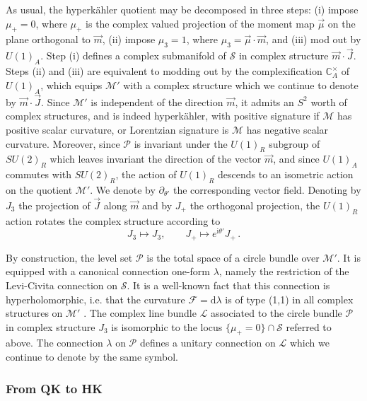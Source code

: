 \documentclass[12pt,reqno]{article}
\numberwithin{equation}{section}
\newcommand{\be}{\begin{equation}}
\newcommand{\ee}{\end{equation}}
\newcommand{\de}{\mathrm{d}}
\newcommand{\I}{\mathrm{i}}
\newcommand{\cS}{\mathcal{S}}
\newcommand{\cM}{\mathcal{M}}
\newcommand{\cP}{\mathcal{P}}
\newcommand{\IC}{\mathbb{C}}
\newcommand{\fb}{\mathscr{F}}
\newcommand{\lb}{\mathscr{L}}
\def\pa{\partial}
\newcommand{\hk}{{hyperk\"ahler}\xspace}
\def\phip{{\theta'}}
\def\pcM{\cM'}
\def\conhyper{\lambda}
\numberwithin{equation}{section}
\begin{document}
As usual, the \hk quotient may be decomposed
in three steps: (i) impose $\mu_+=0$, where $\mu_+$ is the complex valued
projection of the moment map $\vec\mu$ on the plane orthogonal to $\vec m$,
(ii) impose $\mu_3=1$, where $\mu_3=\vec\mu\cdot\vec m$,
and (iii) mod out by $U(1)_A$. Step (i) defines a complex
submanifold of $\cS$ in complex structure $\vec m\cdot \vec J$. Steps (ii) and (iii)
are equivalent to modding out by the complexification $\IC^\times_A$ of $U(1)_A$,
which equips $\pcM$ with a complex structure which we continue to denote by
$ \vec m\cdot\vec J$. Since $\pcM$ is independent of the direction $\vec m$,
it admits an $S^2$ worth of complex structures, and is indeed \hk, with positive
signature if $\cM$ has positive scalar curvature, or Lorentzian signature is $\cM$ has
negative scalar curvature.  Moreover, since $\cP$
is invariant under the $U(1)_R$ subgroup of $SU(2)_R$ which leaves invariant the
direction of the vector $\vec m$, and since $U(1)_A$ commutes with $SU(2)_R$,
the action of $U(1)_R$ descends to an isometric action on the quotient $\pcM$.
We denote by $\pa_\phip$ the corresponding vector field. Denoting by $J_3$
the projection of $\vec J$ along $\vec m$ and by $J_+$
the orthogonal projection, the $U(1)_R$ action
rotates the complex structure according to
\be
\label{U1RJ}
J_3\mapsto J_3, \qquad J_+\mapsto e^{\I\phip} J_+\, .
\ee

By construction, the level set $\cP$ is the total space of a circle bundle over $\pcM$. It is equipped
with a canonical connection one-form $\conhyper$, namely the restriction of the Levi-Civita
connection on $\cS$. It is a well-known fact  that this connection is hyperholomorphic, i.e.
that the curvature $\fb=\de\conhyper$ is of type (1,1) in all complex structures
on $\pcM$ \cite{MR967469,MR1139657,MR1486984}. The complex line bundle $\lb$
associated to the circle bundle $\cP$ in complex structure $J_3$ is isomorphic to the locus
$\{\mu_+=0\}\cap \cS$ referred to above. The connection $\lambda$ on $\cP$
defines a unitary connection on $\lb$ which we continue to denote by the same symbol.



\subsubsection{From QK to HK\label{sub_qktohk}}
\end{document}
